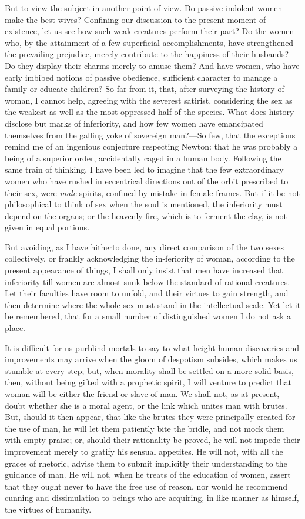 But to view the subject in another point of view. Do passive indolent
women make the best wives? Confining our discussion to the present
moment of existence, let us see how such weak creatures perform their
part? Do the women who, by the attainment of a few superficial
accomplishments, have strengthened the prevailing prejudice, merely
contribute to the happiness of their husbands? Do they display their
charms merely to amuse them? And have women, who have early imbibed
 notions of passive obedience, sufficient character to manage
a family or educate children? So far from it, that, after surveying
the history of woman, I cannot help, agreeing with the severest
satirist, considering the sex as the weakest as well as the most
oppressed half of the species. What does history disclose but marks of
inferiority, and how few women have emancipated themselves from the
galling yoke of sovereign man?---So few, that the exceptions remind me
of an ingenious conjecture respecting Newton: that he was probably a
being of a superior order, accidentally caged in a human body.
Following the same train of thinking, I have been led to imagine that
the few extraordinary women who have rushed in eccentrical directions
out of the orbit prescribed to their sex, were \textit{male} spirits,
confined by mistake in female frames. But if it be not philosophical
to think of sex when the soul is mentioned, the inferiority must
depend on the organs; or the heavenly fire, which is to ferment the
clay, is not given in equal portions.

But avoiding, as I have hitherto done, any direct comparison of the
two sexes collectively, or frankly acknowledging the
in-feriority of woman, according to the present appearance of
things, I shall only insist that men have increased that inferiority
till women are almost sunk below the standard of rational creatures.
Let their faculties have room to unfold, and their virtues to gain
strength, and then determine where the whole sex must stand in the
intellectual scale. Yet let it be remembered, that for a small number
of distinguished women I do not ask a place.

It is difficult for us purblind mortals to say to what height human
discoveries and improvements may arrive when the gloom of despotism
subsides, which makes us stumble at every step; but, when morality
shall be settled on a more solid basis, then, without being gifted
with a prophetic spirit, I will venture to predict that woman will be
either the friend or slave of man. We shall not, as at present, doubt
whether she is a moral agent, or the link which unites man with
brutes. But, should it then appear, that like the brutes they were
principally created for the use of man, he will let them patiently
bite the bridle, and not mock them with empty praise; or, should their
rationality be proved,  he will not impede their improvement
merely to gratify his sensual appetites. He will not, with all the
graces of rhetoric, advise them to submit implicitly their
understanding to the guidance of man. He will not, when he treats of
the education of women, assert that they ought never to have the free
use of reason, nor would he recommend cunning and dissimulation to
beings who are acquiring, in like manner as himself, the virtues of
humanity.

